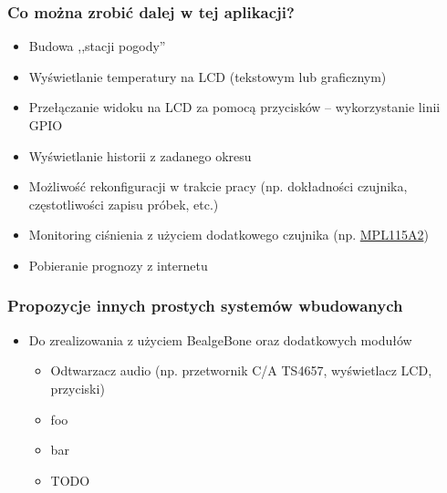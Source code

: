\documentclass[dvipsnames,table]{beamer}
\begin{document}

\begin{frame}
\frametitle{Co można zrobić dalej w tej aplikacji?}
\begin{itemize}
	\item Budowa ,,stacji pogody''
	\item Wyświetlanie temperatury na LCD (tekstowym lub graficznym)
	\item Przełączanie widoku na LCD za pomocą przycisków -- wykorzystanie linii GPIO
	\item Wyświetlanie historii z zadanego okresu
	\item Możliwość rekonfiguracji w trakcie pracy (np. dokładności czujnika, częstotliwości zapisu próbek, etc.)
	\item Monitoring ciśnienia z użyciem dodatkowego czujnika (np. \href{http://www.freescale.com/files/sensors/doc/data_sheet/MPL115A2.pdf}{MPL115A2})
	\item Pobieranie prognozy z internetu
\end{itemize}
\end{frame}

\begin{frame}
\frametitle{Propozycje innych prostych systemów wbudowanych}
\begin{itemize}
	\item Do zrealizowania z użyciem BealgeBone oraz dodatkowych modułów
	\begin{itemize}
		\item Odtwarzacz audio (np. przetwornik C/A TS4657, wyświetlacz LCD, przyciski)
		\item foo
		\item bar
		\item TODO
	\end{itemize}
\end{itemize}
\end{frame}
\end{document}
